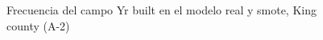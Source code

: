 \begin{figure}[H]
    \centering
    
    \caption{Frecuencia del campo Yr built en el modelo real y smote, King county (A-2)}
    \label{frecuency-smote-yr built}
\end{figure}